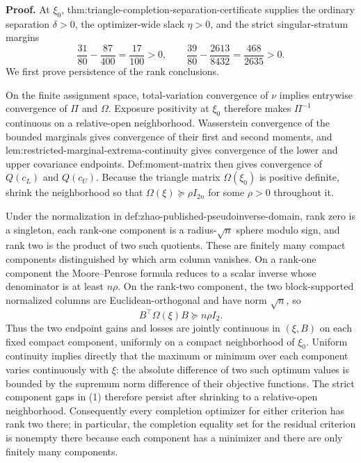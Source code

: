 \textbf{Proof.}
At \(\xi_0\), thm:triangle-completion-separation-certificate supplies the ordinary separation \(\delta>0\), the optimizer-wide slack \(\eta>0\), and the strict singular-stratum margins
\[
\frac{31}{80}-\frac{87}{400}=\frac{17}{100}>0,
\qquad
\frac{39}{80}-\frac{2613}{8432}=\frac{468}{2635}>0.               \tag{1}
\]
We first prove persistence of the rank conclusions.

On the finite assignment space, total-variation convergence of \(\nu\) implies entrywise convergence of \(\Pi\) and \(\Omega\).  Exposure positivity at \(\xi_0\) therefore makes \(\Pi^{-1}\) continuous on a relative-open neighborhood.  Wasserstein convergence of the bounded marginals gives convergence of their first and second moments, and lem:restricted-marginal-extrema-continuity gives convergence of the lower and upper covariance endpoints.  Def:moment-matrix then gives convergence of \(Q(c_L)\) and \(Q(c_U)\).  Because the triangle matrix \(\Omega(\xi_0)\) is positive definite, shrink the neighborhood so that \(\Omega(\xi)\succeq\rho I_{2n}\) for some \(\rho>0\) throughout it.

Under the normalization in def:zhao-published-pseudoinverse-domain, rank zero is a singleton, each rank-one component is a radius-\(\sqrt n\) sphere modulo sign, and rank two is the product of two such quotients.  These are finitely many compact components distinguished by which arm column vanishes.  On a rank-one component the Moore--Penrose formula reduces to a scalar inverse whose denominator is at least \(n\rho\).  On the rank-two component, the two block-supported normalized columns are Euclidean-orthogonal and have norm \(\sqrt n\), so
\[
B^{\top}\Omega(\xi)B\succeq n\rho I_2.                            \tag{2}
\]
Thus the two endpoint gains and losses are jointly continuous in \((\xi,B)\) on each fixed compact component, uniformly on a compact neighborhood of \(\xi_0\).  Uniform continuity implies directly that the maximum or minimum over each component varies continuously with \(\xi\): the absolute difference of two such optimum values is bounded by the supremum norm difference of their objective functions.  The strict component gaps in (1) therefore persist after shrinking to a relative-open neighborhood.  Consequently every completion optimizer for either criterion has rank two there; in particular, the completion equality set for the residual criterion is nonempty there because each component has a minimizer and there are only finitely many components.

